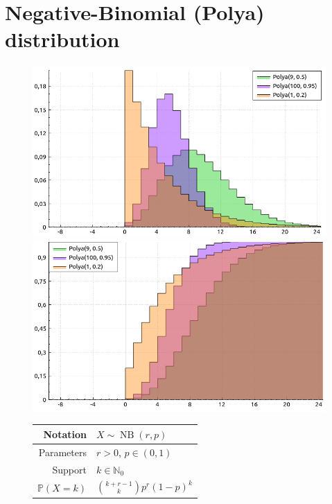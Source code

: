 \documentclass[a4paper,11pt]{article}
\theoremstyle{plain}
\theoremstyle{definition}
\newcommand{\MP}{\mathbb{P}}
\newcommand{\MN}{\mathbb{N}}
\begin{document}
	\section{Negative-Binomial (Polya) distribution}
	\begin{figure}[!htb]\centering
		\begin{minipage}{0.55\textwidth}
			\includegraphics[width=\linewidth, right]{negative-binomial_pmf}
			\captionsetup{labelformat=empty}
			\includegraphics[width=\linewidth, right]{negative-binomial_cdf}
			\captionsetup{labelformat=empty}
		\end{minipage}
		\begin{minipage}{0.4\textwidth}
			\begin{tabular}{| r | l |}
				\hline
				Notation & $ X \sim \operatorname{NB}(r, p) $\\
				\hline
				Parameters & $r > 0$, $p \in (0, 1)$ \\
				\hline
				Support & $ k \in \MN_0 $  \\
				\hline
				$\MP(X = k)$ & $  \binom{k+r-1}{k} p^r (1-p)^k   $ \\

\end{tabular}
\end{minipage}
\end{figure}
\end{document}
